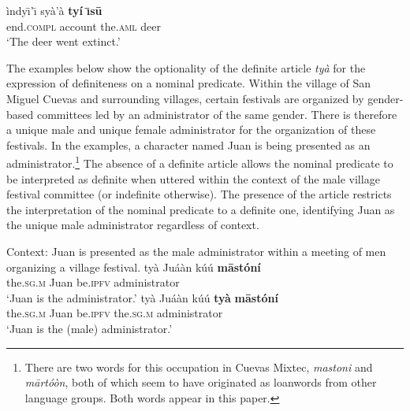 \documentclass[output=paper,modfonts,nonflat]{langsci/langscibook}
\begin{document}
\ea {}\label{ex:cisneros:1}
\gll
\`indy\=\i'\=\i{} sy\`a'\`a {\ob}{\op}\textbf{ty\'i}{\cp} \textbf{\=\i s\=u}{\cb}\\
end.\textsc{compl} account \phantom{[(}the.\textsc{aml} deer\\
\glt
`The deer went extinct.'
\z

The examples below show the optionality of the definite article \textit{ty\`a} for the expression of definiteness on a nominal predicate.  Within the village of San Miguel Cuevas and surrounding villages, certain festivals are organized by gender-based committees led by an administrator of the same gender.  There is therefore a unique male and unique female administrator for the organization of these festivals.  In the examples, a character named Juan is being presented as an administrator.\footnote{There are two words for this occupation in Cuevas Mixtec, \emph{mastoni} and \emph{m\=art\'o\`on}, both of which seem to have originated as loanwords from other language groups.  Both words appear in this paper.}  The absence of a definite article allows the nominal predicate to be interpreted as definite when uttered within the context of the male village festival committee (or indefinite otherwise).  The presence of the article restricts the interpretation of the nominal predicate to a definite one, identifying Juan as the unique male administrator regardless of context.

\ea {}\label{ex:cisneros:2}
Context: Juan is presented as the male administrator within a meeting of men organizing a village festival.
\ea
\gll
{\ob}ty\`a Ju\'a\`an{\cb} k\'u\'u \textbf{m\=ast\'on\'i}\\
\phantom{[}the.\textsc{sg.m} Juan be.\textsc{ipfv} administrator\\
\glt
`Juan is the administrator.'
\ex
\gll
{\ob}ty\`a Ju\'a\`an{\cb} k\'u\'u {\ob}\textbf{ty\`a} \textbf{m\=ast\'on\'i}{\cb}\\
\phantom{[}the.\textsc{sg.m} Juan be.\textsc{ipfv} \phantom{[}the.\textsc{sg.m} administrator\\
\glt
`Juan is the (male) administrator.'
\z 
\z 
\end{document}
